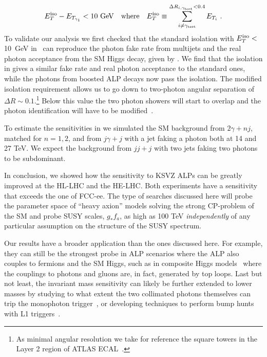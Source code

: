 \begin{equation}
E_{T}^{\rm iso}-E_{T_{\gamma_1}}<{\rm 10~GeV}
\quad {\rm  where}\quad
E_{T}^{\rm iso}\equiv \sum_{i\neq \gamma_{\rm test}}^{\Delta R_{i,\gamma_{\rm test}}<0.4} E_{T_i} \ . \label{eq:newiso}
\end{equation}
%
To validate our analysis we first checked that the standard isolation with $E_{T}^{\rm iso}<$10~GeV in \delphes\, can reproduce the photon fake rate from multijets and the real photon acceptance from the SM Higgs decay, given by . We find that the isolation in  gives a similar fake rate and real photon acceptance to the standard ones, while the photons from boosted ALP decays now pass the isolation. The modified isolation requirement allows us to go down to two-photon angular separation of $\Delta R\sim0.1$.\footnote{As minimal angular resolution we take for reference the square towers in the Layer 2 region of ATLAS ECAL~\cite{Aaboud:2016yuq}.} Below this value the two photon showers will start to overlap and the photon identification will have to be modified~\cite{Ellis:2012sd,Ellis:2012zp}.

To estimate the sensitivities in  we simulated the SM background from $2\gamma+n j$, matched for $n=1,2$, and from $j\gamma+j$ with a jet faking a photon both at 14 and 27 TeV. We expect the background from  $jj+j$ with two jets faking two photons to be subdominant.

In conclusion, we showed how the sensitivity to KSVZ ALPs can be greatly improved at the HL-LHC and the HE-LHC. Both experiments have a sensitivity that exceeds the one of FCC-ee. The type of searches discussed here will probe the parameter space of ``heavy axion'' models solving the strong CP-problem of the SM and probe SUSY scales, $g_{\ast} f_a$, as high as 100 TeV \emph{independently} of any particular assumption on the structure of the SUSY spectrum.

Our results have a broader application than the ones discussed here.  For example, they can still be the strongest probe in ALP scenarios where the ALP also couples to fermions and the SM Higgs, such as in composite Higgs models~\cite{Ferretti:2013kya,Cacciapaglia:2017iws} where the couplings to photons and gluons are, in fact, generated by top loops. Last but not least, the invariant mass sensitivity can likely be further extended to lower masses by studying to what extent the two collimated photons themselves can trip the monophoton trigger~\cite{toappear}, or developing techniques to perform bump hunts with L1 triggers~\cite{Collaboration:2283192}.






